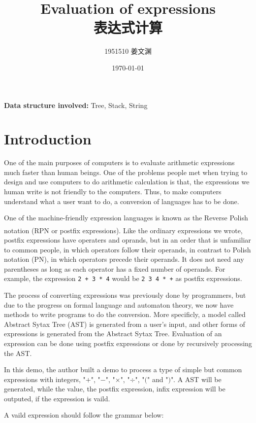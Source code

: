 \documentclass[cn,black,12pt,normal]{elegantnote}
\title{Evaluation of expressions\\表达式计算}
\author{1951510\; 姜文渊}
\institute{\small \url{https://github.com/jwyjohn/Jwy_DataStructureHomework}}
\date{\today}
\newcommand{\uct}[1]{\textsuperscript{\textsuperscript{\cite{#1}}}}
\begin{document}
\maketitle

\textbf{Data structure involved:} Tree, Stack, String

\tableofcontents

\newpage

\section{Introduction}

One of the main purposes of computers is to evaluate arithmetic expressions much faster than human beings. One of the problems people met when trying to design and use computers to do arithmetic calculation is that, the expressions we human write is not friendly to the computers. Thus, to make computers understand what a user want to do, a conversion of languages has to be done.

One of the machine-friendly expression languages is known as the Reverse Polish notation (RPN or postfix expressions).\uct{wiki:Reverse_Polish_notation} Like the ordinary expressions we wrote, postfix expressions have operaters and oprands, but in an order that is unfamiliar to common people, in which operators follow their operands, in contrast to Polish notation (PN), in which operators precede their operands. It does not need any parentheses as long as each operator has a fixed number of operands. For example, the expression \lstinline{2 + 3 * 4} would be \lstinline{2 3 4 * +} as postfix expressions.

The process of converting expressions was previously done by programmers, but due to the progress on formal language and automaton theory, we now have methods to write programs to do the conversion. More specificly, a model called Abstract Sytax Tree (AST) is generated from a user's input, and other forms of expressions is generated from the Abstract Sytax Tree. Evaluation of an expression can be done using postfix expressions or done by recursively processing the AST.

In this demo, the author built a demo to process a type of simple but common expressions with integers, "$+$", "$-$", "$\times$", "$\div$", "$($" and "$)$". A AST will be generated, while the value, the postfix expression, infix expression will be outputed, if the expression is vaild.

A vaild expression should follow the grammar below:
\end{document}
